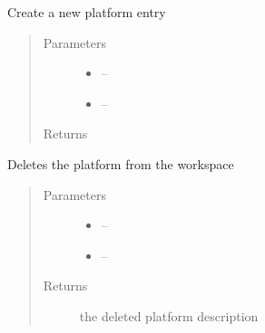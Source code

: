 \documentclass[letterpaper,10pt,english]{sphinxmanual}
\begin{document}
\begin{fulllineitems}
\label{_source/son_editor.impl:son_editor.impl.platformsimpl.create_platform}
Create a new platform entry
\begin{quote}\begin{description}
\item[{Parameters}] \leavevmode\begin{itemize}
\item {} 
 -- 

\item {} 
 -- 

\end{itemize}

\item[{Returns}] \leavevmode


\end{description}\end{quote}

\end{fulllineitems}


\begin{fulllineitems}
\label{_source/son_editor.impl:son_editor.impl.platformsimpl.delete}
Deletes the platform from the workspace
\begin{quote}\begin{description}
\item[{Parameters}] \leavevmode\begin{itemize}
\item {} 
 -- 

\item {} 
 -- 

\end{itemize}

\item[{Returns}] \leavevmode
the deleted platform description

\end{description}\end{quote}

\end{fulllineitems}
\end{document}
